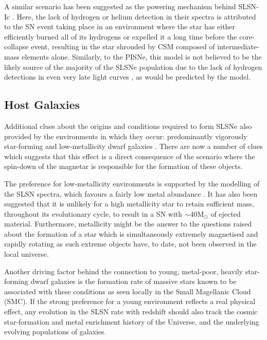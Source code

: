 A similar scenario has been suggested as the powering mechanism behind SLSN-Ic \citep{Chevalier2011}. Here, the lack of hydrogen or helium detection in their spectra is attributed to the SN event taking place in an environment where the star has either efficiently burned all of its hydrogens or expelled it a long time before the core-collapse event, resulting in the star shrouded by CSM composed of intermediate-mass elements alone. Similarly, to the PISNe, this model is not believed to be the likely source of the majority of the SLSNe population due to the lack of hydrogen detections in even very late light curves \citep{Jerkstrand2016}, as would be predicted by the model.

\subsection{Host Galaxies}
Additional clues about the origins and conditions required to form SLSNe also provided by the environments in which they occur: predominantly vigorously star-forming and low-metallicity dwarf galaxies \citep[e.g.,][]{Lunnan2014,Leloudas2015,Angus2016}. There are now a number of clues which suggests that this effect is a direct consequence of the scenario where the spin-down of the magnetar is responsible for the formation of these objects.

The preference for low-metallicity environments is supported by the modelling of the SLSN spectra, which favours a fairly low metal abundance \citep{Mazzali2015}. It has also been suggested \citep{Nomoto2016} that it is unlikely for a high metallicity star to retain sufficient mass, throughout its evolutionary cycle, to result in a SN with $\sim$40M$_{\odot}$ of ejected material. Furthermore, metallicity might be the answer to the questions raised about the formation of a star which is simultaneously extremely magnetised and rapidly rotating as such extreme objects have, to date, not been observed in the local universe.

Another driving factor behind the connection to young, metal-poor, heavily star-forming dwarf galaxies is the formation rate of massive stars known to be associated with these conditions as seen locally in the Small Magellanic Cloud (SMC). If the strong preference for a young environment reflects a real physical effect, any evolution in the SLSN rate with redshift should also track the cosmic star-formation and metal enrichment history of the Universe, and the underlying evolving populations of galaxies.

